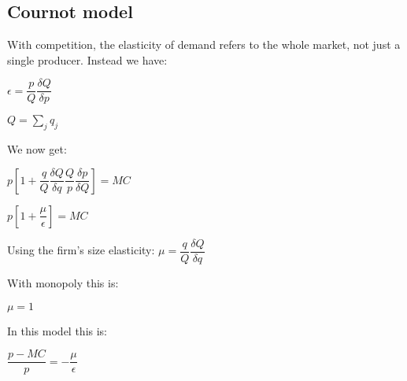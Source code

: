 

\subsection{Cournot model}

With competition, the elasticity of demand refers to the whole market, not just a single producer. Instead we have:

\(\epsilon = \dfrac{p}{Q}\dfrac{\delta Q}{\delta p}\)

\(Q=\sum_j q_j\)

We now get:

\(p[1+\dfrac{q}{Q}\dfrac{\delta Q}{\delta q}\dfrac{Q}{p}\dfrac{\delta p}{\delta Q}]=MC\)

\(p[1+\dfrac{\mu }{\epsilon }]=MC\)

Using the firm's size elasticity: \(\mu = \dfrac{q}{Q}\dfrac{\delta Q}{\delta q}\)

With monopoly this is:

\(\mu = 1\)



In this model this is:

\(\dfrac{p-MC}{p}=-\dfrac{\mu}{\epsilon }\)

